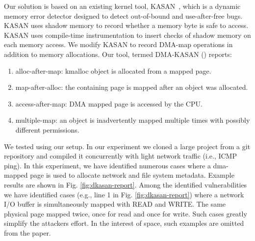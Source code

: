 Our solution is based on an existing kernel tool, KASAN~\cite{kasan}, which is a dynamic memory error detector designed to detect out-of-bound and use-after-free bugs. KASAN uses shadow memory to record whether a memory byte is safe to access. KASAN uses compile-time instrumentation to insert checks of shadow memory on each memory access. 
We modify KASAN to record DMA-map operations in addition to memory allocations. Our tool, termed DMA-KASAN (\dkasan) reports: 
\begin{enumerate}
    \item alloc-after-map:  kmalloc object is allocated from a mapped page.
    \item map-after-alloc:  the containing page is mapped after an object was allocated.
    \item access-after-map: DMA mapped page is accessed by the CPU.
    \item multiple-map: an object is inadvertently mapped multiple times with possibly different permissions.
\end{enumerate}
We tested \dkasan using our setup. In our experiment we cloned a large project from a git repository and compiled it concurrently with light network traffic (i.e., ICMP ping). In this experiment, we have identified numerous cases where a dma-mapped page is used to allocate network and file system metadata. Example results are shown in Fig. \ref{fig:dkasan-report}. 
Among the identified vulnerabilities we have identified cases (e.g., line 1 in Fig. \ref{fig:dkasan-report}) where a network I/O buffer is simultaneously mapped with READ and WRITE. The same physical page mapped twice, once for read and once for write. Such cases greatly simplify the attackers effort. In the interest of space, such examples are omitted from the paper. 

